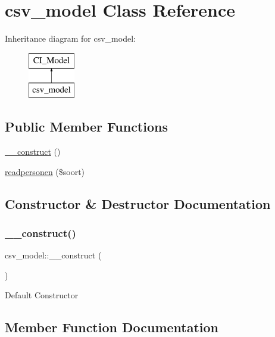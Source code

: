 \hypertarget{classcsv__model}{}\section{csv\+\_\+model Class Reference}
\label{classcsv__model}
Inheritance diagram for csv\+\_\+model\+:\begin{figure}[H]
\begin{center}
\leavevmode
\includegraphics[height=2.000000cm]{classcsv__model}
\end{center}
\end{figure}
\subsection*{Public Member Functions}
\begin{DoxyCompactItemize}
\item 
\mbox{\hyperlink{classcsv__model_aab4883e6263bbcae1d6a7e8361a0c5a3}{\+\_\+\+\_\+construct}} ()
\item 
\mbox{\hyperlink{classcsv__model_a30a1a661f6bbd9fabd697b21b7c9ebce}{readpersonen}} (\$soort)
\end{DoxyCompactItemize}


\subsection{Constructor \& Destructor Documentation}
\mbox{\label{classcsv__model_aab4883e6263bbcae1d6a7e8361a0c5a3}} 
\subsubsection{\texorpdfstring{\+\_\+\+\_\+construct()}{\_\_construct()}}
{\footnotesize\ttfamily csv\+\_\+model\+::\+\_\+\+\_\+construct (\begin{DoxyParamCaption}{ }\end{DoxyParamCaption})}

Default Constructor 

\subsection{Member Function Documentation}
\mbox{\label{classcsv__model_a30a1a661f6bbd9fabd697b21b7c9ebce}} 
